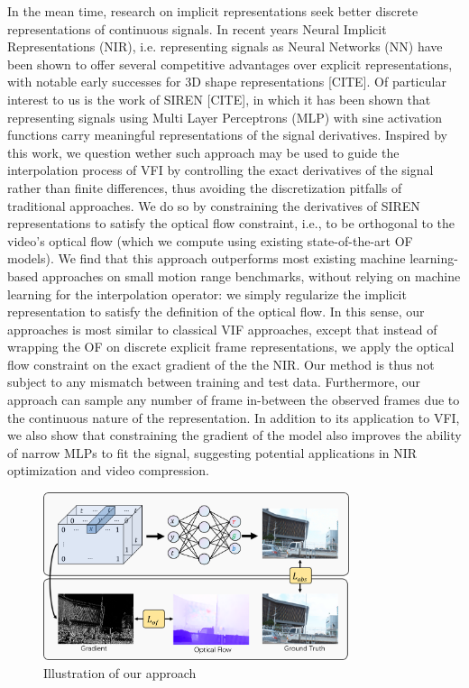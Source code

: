 \documentclass{article}
\begin{document}
In the mean time, research on implicit representations seek better discrete representations of continuous signals.
In recent years Neural Implicit Representations (NIR), i.e. representing signals as Neural Networks (NN)
have been shown to offer several competitive advantages over explicit representations,
with notable early successes for 3D shape representations [CITE].
Of particular interest to us is the work of SIREN [CITE],
in which it has been shown that representing
signals using Multi Layer Perceptrons (MLP) with sine activation functions
carry meaningful representations of the signal derivatives.
Inspired by this work, we question wether such approach may be used to guide the interpolation
process of VFI by controlling the exact derivatives of the signal rather than finite differences,
thus avoiding the discretization pitfalls of traditional approaches.
We do so by constraining the derivatives of SIREN representations to satisfy the optical flow constraint,
i.e., to be orthogonal to the video's optical flow
(which we compute using existing state-of-the-art OF models).
We find that this approach outperforms most existing
machine learning-based approaches on small motion range benchmarks,
without relying on machine learning for the interpolation operator:
we simply regularize the implicit representation to satisfy the definition of the optical flow.
In this sense, our approaches is most similar to classical VIF approaches,
except that instead of wrapping the OF on discrete explicit frame representations,
we apply the optical flow constraint on the exact gradient of the the NIR.
Our method is thus not subject to any mismatch between training and test data.
Furthermore, our approach can sample any number of frame in-between the observed frames
due to the continuous nature of the representation.
In addition to its application to VFI, we also show that constraining the gradient
of the model also improves the ability of narrow MLPs to fit the signal,
suggesting potential applications in NIR optimization and video compression.

\begin{figure}[h]
\centering
\includegraphics[width=0.8\textwidth]{Method}
\caption{Illustration of our approach}
\end{figure}
\end{document}
